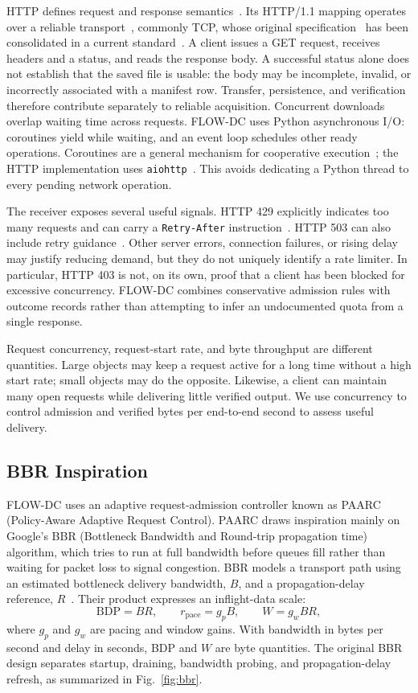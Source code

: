 HTTP defines request and response semantics~\cite{rfc9110}. Its HTTP/1.1 mapping operates over a reliable transport~\cite{http}, commonly TCP, whose original specification~\cite{tcp} has been consolidated in a current standard~\cite{tcp-current}. A client issues a GET request, receives headers and a status, and reads the response body. A successful status alone does not establish that the saved file is usable: the body may be incomplete, invalid, or incorrectly associated with a manifest row. Transfer, persistence, and verification therefore contribute separately to reliable acquisition. Concurrent downloads overlap waiting time across requests. FLOW-DC uses Python asynchronous I/O: coroutines yield while waiting, and an event loop schedules other ready operations. Coroutines are a general mechanism for cooperative execution~\cite{async}; the HTTP implementation uses \texttt{aiohttp}~\cite{aiohttp}. This avoids dedicating a Python thread to every pending network operation.

The receiver exposes several useful signals. HTTP 429 explicitly indicates too many requests and can carry a \texttt{Retry-After} instruction~\cite{http-codes}. HTTP 503 can also include retry guidance~\cite{rfc9110}. Other server errors, connection failures, or rising delay may justify reducing demand, but they do not uniquely identify a rate limiter. In particular, HTTP 403 is not, on its own, proof that a client has been blocked for excessive concurrency. FLOW-DC combines conservative admission rules with outcome records rather than attempting to infer an undocumented quota from a single response.

Request concurrency, request-start rate, and byte throughput are different quantities. Large objects may keep a request active for a long time without a high start rate; small objects may do the opposite. Likewise, a client can maintain many open requests while delivering little verified output. We use concurrency to control admission and verified bytes per end-to-end second to assess useful delivery.

\subsection{BBR Inspiration}
FLOW-DC uses an adaptive request-admission controller known as PAARC (Policy-Aware Adaptive Request Control). PAARC draws inspiration mainly on Google's BBR (Bottleneck Bandwidth and Round-trip propagation time)~\cite{bbr} algorithm, which tries to run at full bandwidth before queues fill rather than waiting for packet loss to signal congestion. BBR models a transport path using an estimated bottleneck delivery bandwidth, $B$, and a propagation-delay reference, $R$~\cite{bbr}. Their product expresses an inflight-data scale:
\begin{equation}
\mathrm{BDP}=BR,\qquad r_{\mathrm{pace}}=g_pB,\qquad W=g_wBR,
\label{eq:bbr}
\end{equation}
where $g_p$ and $g_w$ are pacing and window gains. With bandwidth in bytes per second and delay in seconds, BDP and $W$ are byte quantities. The original BBR design separates startup, draining, bandwidth probing, and propagation-delay refresh, as summarized in Fig.~\ref{fig:bbr}.


